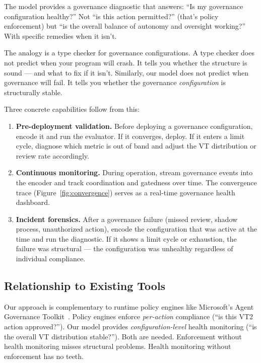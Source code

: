 \documentclass[sigconf,nonacm]{acmart}
\begin{document}
The model provides a governance diagnostic that answers: ``Is my governance
configuration healthy?'' Not ``is this action permitted?'' (that's policy
enforcement) but ``is the overall balance of autonomy and oversight
working?'' With specific remedies when it isn't.

The analogy is a type checker for governance configurations. A type checker
does not predict when your program will crash. It tells you whether the
structure is sound --- and what to fix if it isn't. Similarly, our model
does not predict when governance will fail. It tells you whether the
governance \emph{configuration} is structurally stable.

Three concrete capabilities follow from this:

\begin{enumerate}[leftmargin=*]
  \item \textbf{Pre-deployment validation.} Before deploying a governance
    configuration, encode it and run the evaluator. If it converges, deploy.
    If it enters a limit cycle, diagnose which metric is out of band and
    adjust the VT distribution or review rate accordingly.

  \item \textbf{Continuous monitoring.} During operation, stream governance
    events into the encoder and track coordination and gatedness over time.
    The convergence trace (Figure~\ref{fig:convergence}) serves as a
    real-time governance health dashboard.

  \item \textbf{Incident forensics.} After a governance failure (missed
    review, shadow process, unauthorized action), encode the configuration
    that was active at the time and run the diagnostic. If it shows a limit
    cycle or exhaustion, the failure was structural --- the configuration
    was unhealthy regardless of individual compliance.
\end{enumerate}

\subsection{Relationship to Existing Tools}

Our approach is complementary to runtime policy engines like Microsoft's
Agent Governance Toolkit~\cite{microsoft}. Policy engines enforce
\emph{per-action} compliance (``is this VT2 action approved?''). Our model
provides \emph{configuration-level} health monitoring (``is the overall VT
distribution stable?''). Both are needed. Enforcement without health
monitoring misses structural problems. Health monitoring without
enforcement has no teeth.
\end{document}

